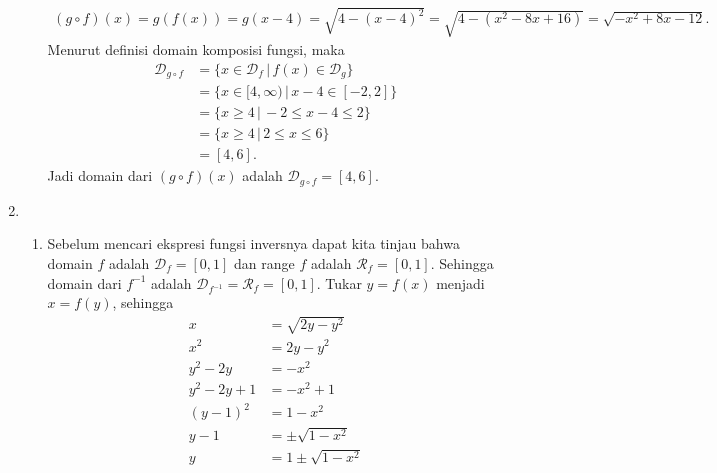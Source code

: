 \documentclass[11pt,openany,a4paper]{article}
\begin{document}
\begin{enumerate}
\begin{enumerate}
\begin{align*}
                        (g \circ f)(x)  = g(f(x))
                        = g(x - 4)
                        = \sqrt{4 - (x - 4)^2}
                        = \sqrt{4 - (x^2 - 8x + 16)}
                        = \sqrt{-x^2 + 8x - 12}.
                    \end{align*}
                    Menurut definisi domain komposisi fungsi, maka
                    \begin{align*}
                        \mathcal{D}_{g \circ f} & = \{x \in \mathcal{D}_f \,|\, f(x) \in \mathcal{D}_g\} \\
                                                & = \{x \in [4,\infty) \,|\, x - 4 \in [-2,2]\}          \\
                                                & = \{x \geq 4 \,|\, -2 \leq x - 4 \leq 2\}              \\
                                                & = \{x \geq 4 \,|\, 2 \leq x \leq 6\}                   \\
                                                & = [4,6].
                    \end{align*}
                    Jadi domain dari $(g \circ f)(x)$ adalah $\mathcal{D}_{
                            g \circ f
                        } = [4,6]$.
          \end{enumerate}
    \item \begin{enumerate}
              \item Sebelum mencari ekspresi fungsi inversnya dapat kita tinjau bahwa domain $f$ adalah $\mathcal{D}_f = [0,1]$ dan range $f$ adalah $\mathcal{R}_f = [0,1]$. Sehingga domain dari $f^{-1}$ adalah $\mathcal{D}_{f^{-1}} = \mathcal{R}_f = [0,1]$.
                    Tukar $y = f(x)$ menjadi $x = f(y)$, sehingga
                    \begin{align*}
                        x            & = \sqrt{2y - y^2}      \\
                        x^2          & = 2y - y^2             \\
                        y^2 - 2y     & = -x^2                 \\
                        y^2 - 2y + 1 & = -x^2 + 1             \\
                        (y - 1)^2    & = 1 - x^2              \\
                        y - 1        & = \pm\sqrt{1 - x^2}    \\
                        y            & = 1 \pm \sqrt{1 - x^2}

\end{align*}
\end{enumerate}
\end{enumerate}
\end{document}
